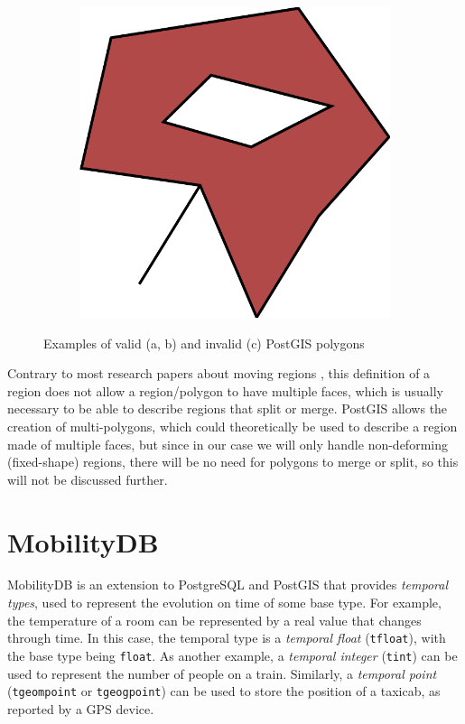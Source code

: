 \begin{figure}[h!]
\begin{subfigure}{.3\textwidth}
  \centering
  \includegraphics[width=.8\linewidth]{images/polygon_spike.pdf}
  \caption{}
  \label{fig:polygon_spike}
\end{subfigure}
\caption{Examples of valid (a, b) and invalid (c) PostGIS polygons}
\label{fig:postgis_polygon}
\end{figure}

Contrary to most research papers about moving regions \cite{polyhedra,model_structure_for_mod,moving_obj_foundation}, this definition of a region does not allow a region/polygon to have multiple faces, which is usually necessary to be able to describe regions that split or merge. PostGIS allows the creation of multi-polygons, which could theoretically be used to describe a region made of multiple faces, but since in our case we will only handle non-deforming (fixed-shape) regions, there will be no need for polygons to merge or split, so this will not be discussed further.

\section{MobilityDB}
\label{section:mobilitydb}

MobilityDB \cite{mobilitydb} is an extension to PostgreSQL and PostGIS that provides \textit{temporal types}, used to represent the evolution on time of some base type. For example, the temperature of a room can be represented by a real value that changes through time. In this case, the temporal type is a \textit{temporal float} (\lstinline{tfloat}), with the base type being \lstinline{float}. As another example, a \textit{temporal integer} (\lstinline{tint}) can be used to represent the number of people on a train. Similarly, a \textit{temporal point} (\lstinline{tgeompoint} or \lstinline{tgeogpoint}) can be used to store the position of a taxicab, as reported by a GPS device.

